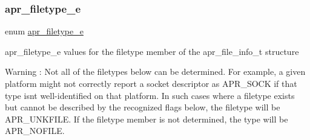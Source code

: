 \subsubsection{\texorpdfstring{apr\+\_\+filetype\+\_\+e}{apr\_filetype\_e}}
{\footnotesize\ttfamily enum \mbox{\hyperlink{group__apr__file__info_gae3f0ce3014337a52b39852f8bf81ca7c}{apr\+\_\+filetype\+\_\+e}}}

apr\+\_\+filetype\+\_\+e values for the filetype member of the apr\+\_\+file\+\_\+info\+\_\+t structure \begin{DoxyWarning}{Warning}
\+: Not all of the filetypes below can be determined. For example, a given platform might not correctly report a socket descriptor as A\+P\+R\+\_\+\+S\+O\+CK if that type isn\textquotesingle{}t well-\/identified on that platform. In such cases where a filetype exists but cannot be described by the recognized flags below, the filetype will be A\+P\+R\+\_\+\+U\+N\+K\+F\+I\+LE. If the filetype member is not determined, the type will be A\+P\+R\+\_\+\+N\+O\+F\+I\+LE. 
\end{DoxyWarning}
